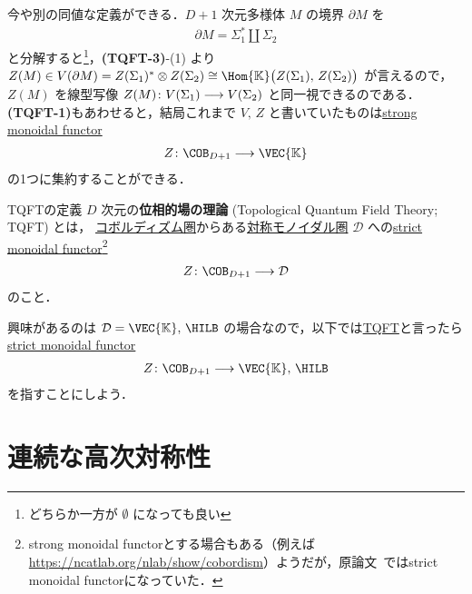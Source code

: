 \documentclass[TQFT_main]{subfiles}
\begin{document}
今や別の同値な定義ができる．$D+1$ 次元多様体 $M$ の境界 $\partial M$ を
\begin{align}
    \partial M = \Sigma_1^* \amalg \Sigma_2
\end{align}
と分解すると\footnote{どちらか一方が $\emptyset$ になっても良い}，\textsf{\textbf{(TQFT-3)}}-(1) より
$Z(M) \in V(\partial M) = Z(\Sigma_1)^* \otimes Z(\Sigma_2) \cong \Hom{\mathbb{K}} \bigl( Z(\Sigma_1),\, Z(\Sigma_2) \bigr)$ が言えるので，$Z(M)$ を線型写像 $Z(M) \colon V(\Sigma_1) \longrightarrow V(\Sigma_2)$ と同一視できるのである．
\textsf{\textbf{(TQFT-1)}}もあわせると，結局これまで $V,\, Z$ と書いていたものは\hyperref[def:monidal-functor]{strong monoidal functor}
\begin{align}
    Z \colon \COB_{D+1} \lto \VEC{\mathbb{K}}
\end{align}
の1つに集約することができる．

\begin{mydef}[label=def:TQFT]{TQFTの定義}
    $D$ 次元の\textbf{位相的場の理論} (Topological Quantum Field Theory; TQFT) とは，
    \hyperref[Cob-string]{コボルディズム圏}からある\hyperref[def:braided-monoidal]{対称モノイダル圏} $\mathcal{D}$ への\hyperref[def:monidal-functor]{strict monoidal functor}\footnote{strong monoidal functorとする場合もある（例えば\url{https://ncatlab.org/nlab/show/cobordism}）ようだが，原論文~\cite{Atiyah1988tqft}ではstrict monoidal functorになっていた．}
    \begin{align}
        Z \colon \COB_{D+1} \lto \mathcal{D}
    \end{align}
    のこと．
\end{mydef}

興味があるのは $\mathcal{D} = \VEC{\mathbb{K}},\, \HILB$ の場合なので，以下では\hyperref[ax:Atiyah-TQFT]{TQFT}と言ったら\hyperref[def:monidal-functor]{strict monoidal functor}
\begin{align}
    Z \colon \COB_{D+1} \lto \VEC{\mathbb{K}},\, \HILB
\end{align}
を指すことにしよう．

\section{連続な高次対称性}
\end{document}
